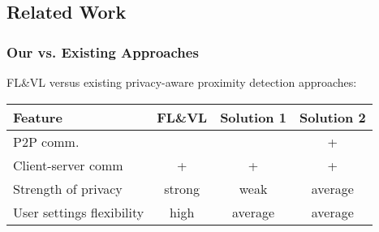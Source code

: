\subsection{Related Work} %


\begin{frame}[red] %
\frametitle{Our vs. Existing Approaches }
FL\&VL versus existing privacy-aware proximity detection approaches:
\begin{center}  
	\begin{tabular}{| l | c | c | c |}
	\hline
	\textbf{Feature}		& \textbf{FL\&VL}	& \textbf{Solution 1}	& \textbf{Solution 2} \\ \hline 
	P2P comm.			&			&			& + \\ \hline
	Client-server comm		& +			&   +			& + \\ \hline
	Strength of privacy		& strong		& weak			& average \\ \hline		
	User settings flexibility	& high			& average		& average \\ \hline		
	\end{tabular}
\end{center}	

\end{frame}



